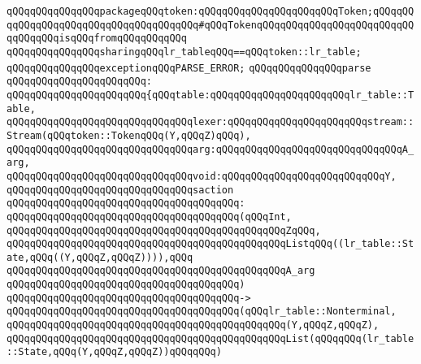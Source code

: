 \verb|qQQqqQQqqQQqqQQqpackageqQQqtoken:qQQqqQQqqQQqqQQqqQQqqQQqToken;qQQqqQQqqQQqqQQqqQQqqQQqqQQqqQQqqQQqqQQq#qQQqTokenqQQqqQQqqQQqqQQqqQQqqQQqqQQqqQQqqQQqisqQQqfromqQQqqQQqqQQq|\newline
\newline
\verb|qQQqqQQqqQQqqQQqsharingqQQqlr_tableqQQq==qQQqtoken::lr_table;|\newline
\newline
\verb|qQQqqQQqqQQqqQQqexceptionqQQqPARSE_ERROR;|\newline
\newline
\verb|qQQqqQQqqQQqqQQqparse|\newline
\verb|qQQqqQQqqQQqqQQqqQQqqQQq:|\newline
\verb|qQQqqQQqqQQqqQQqqQQqqQQq{qQQqtable:qQQqqQQqqQQqqQQqqQQqqQQqlr_table::Table,|\newline
\verb|qQQqqQQqqQQqqQQqqQQqqQQqqQQqqQQqlexer:qQQqqQQqqQQqqQQqqQQqqQQqstream::Stream(qQQqtoken::TokenqQQq(Y,qQQqZ)qQQq),|\newline
\verb|qQQqqQQqqQQqqQQqqQQqqQQqqQQqqQQqarg:qQQqqQQqqQQqqQQqqQQqqQQqqQQqqQQqA_arg,|\newline
\verb|qQQqqQQqqQQqqQQqqQQqqQQqqQQqqQQqvoid:qQQqqQQqqQQqqQQqqQQqqQQqqQQqY,|\newline
\newline
\verb|qQQqqQQqqQQqqQQqqQQqqQQqqQQqqQQqsaction|\newline
\verb|qQQqqQQqqQQqqQQqqQQqqQQqqQQqqQQqqQQqqQQq:|\newline
\verb|qQQqqQQqqQQqqQQqqQQqqQQqqQQqqQQqqQQqqQQq(qQQqInt,|\newline
\verb|qQQqqQQqqQQqqQQqqQQqqQQqqQQqqQQqqQQqqQQqqQQqqQQqZqQQq,|\newline
\verb|qQQqqQQqqQQqqQQqqQQqqQQqqQQqqQQqqQQqqQQqqQQqqQQqListqQQq((lr_table::State,qQQq((Y,qQQqZ,qQQqZ)))),qQQq|\newline
\verb|qQQqqQQqqQQqqQQqqQQqqQQqqQQqqQQqqQQqqQQqqQQqqQQqA_arg|\newline
\verb|qQQqqQQqqQQqqQQqqQQqqQQqqQQqqQQqqQQqqQQq)|\newline
\verb|qQQqqQQqqQQqqQQqqQQqqQQqqQQqqQQqqQQqqQQq->|\newline
\verb|qQQqqQQqqQQqqQQqqQQqqQQqqQQqqQQqqQQqqQQq(qQQqlr_table::Nonterminal,|\newline
\verb|qQQqqQQqqQQqqQQqqQQqqQQqqQQqqQQqqQQqqQQqqQQqqQQq(Y,qQQqZ,qQQqZ),|\newline
\verb|qQQqqQQqqQQqqQQqqQQqqQQqqQQqqQQqqQQqqQQqqQQqqQQqList(qQQqqQQq(lr_table::State,qQQq(Y,qQQqZ,qQQqZ))qQQqqQQq)|\newline
